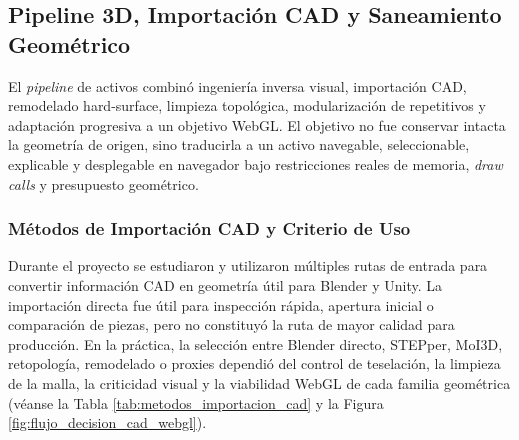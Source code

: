 \subsection{Pipeline 3D, Importación CAD y Saneamiento Geométrico}

El \textit{pipeline} de activos combinó ingeniería inversa visual, importación CAD, remodelado hard-surface, limpieza topológica, modularización de repetitivos y adaptación progresiva a un objetivo WebGL. El objetivo no fue conservar intacta la geometría de origen, sino traducirla a un activo navegable, seleccionable, explicable y desplegable en navegador bajo restricciones reales de memoria, \textit{draw calls} y presupuesto geométrico.

\subsubsection{Métodos de Importación CAD y Criterio de Uso}

Durante el proyecto se estudiaron y utilizaron múltiples rutas de entrada para convertir información CAD en geometría útil para Blender y Unity. La importación directa fue útil para inspección rápida, apertura inicial o comparación de piezas, pero no constituyó la ruta de mayor calidad para producción. En la práctica, la selección entre Blender directo, STEPper, MoI3D, retopología, remodelado o proxies dependió del control de teselación, la limpieza de la malla, la criticidad visual y la viabilidad WebGL de cada familia geométrica (véanse la Tabla \ref{tab:metodos_importacion_cad} y la Figura \ref{fig:flujo_decision_cad_webgl}).

